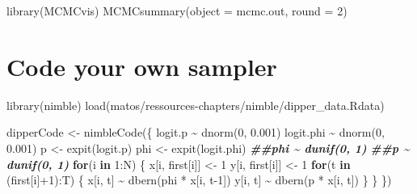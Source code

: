 \documentclass[
  12pt,
]{krantz}
\newenvironment{Shaded}{\begin{snugshade}}{\end{snugshade}}
\newcommand{\AttributeTok}[1]{\textcolor[rgb]{0.77,0.63,0.00}{#1}}
\newcommand{\ControlFlowTok}[1]{\textcolor[rgb]{0.13,0.29,0.53}{\textbf{#1}}}
\newcommand{\DecValTok}[1]{\textcolor[rgb]{0.00,0.00,0.81}{#1}}
\newcommand{\DocumentationTok}[1]{\textcolor[rgb]{0.56,0.35,0.01}{\textbf{\textit{#1}}}}
\newcommand{\FloatTok}[1]{\textcolor[rgb]{0.00,0.00,0.81}{#1}}
\newcommand{\FunctionTok}[1]{\textcolor[rgb]{0.00,0.00,0.00}{#1}}
\newcommand{\NormalTok}[1]{#1}
\newcommand{\OtherTok}[1]{\textcolor[rgb]{0.56,0.35,0.01}{#1}}
\newcommand{\SpecialCharTok}[1]{\textcolor[rgb]{0.00,0.00,0.00}{#1}}
\newcommand{\StringTok}[1]{\textcolor[rgb]{0.31,0.60,0.02}{#1}}
\begin{document}
\begin{Shaded}
\begin{Highlighting}[]
\FunctionTok{library}\NormalTok{(MCMCvis)}
\FunctionTok{MCMCsummary}\NormalTok{(}\AttributeTok{object =}\NormalTok{ mcmc.out, }\AttributeTok{round =} \DecValTok{2}\NormalTok{)}
\end{Highlighting}
\end{Shaded}

\hypertarget{code-your-own-sampler}{%
\section{Code your own sampler}\label{code-your-own-sampler}}

\begin{Shaded}
\begin{Highlighting}[]
\FunctionTok{library}\NormalTok{(nimble)}
\FunctionTok{load}\NormalTok{(}\StringTok{\textquotesingle{}matos/ressources{-}chapters/nimble/dipper\_data.Rdata\textquotesingle{}}\NormalTok{)}

\NormalTok{dipperCode }\OtherTok{\textless{}{-}} \FunctionTok{nimbleCode}\NormalTok{(\{}
\NormalTok{    logit.p }\SpecialCharTok{\textasciitilde{}} \FunctionTok{dnorm}\NormalTok{(}\DecValTok{0}\NormalTok{, }\FloatTok{0.001}\NormalTok{)}
\NormalTok{    logit.phi }\SpecialCharTok{\textasciitilde{}} \FunctionTok{dnorm}\NormalTok{(}\DecValTok{0}\NormalTok{, }\FloatTok{0.001}\NormalTok{)}
\NormalTok{    p }\OtherTok{\textless{}{-}} \FunctionTok{expit}\NormalTok{(logit.p)}
\NormalTok{    phi }\OtherTok{\textless{}{-}} \FunctionTok{expit}\NormalTok{(logit.phi)}
    \DocumentationTok{\#\#phi \textasciitilde{} dunif(0, 1)}
    \DocumentationTok{\#\#p \textasciitilde{} dunif(0, 1)}
    \ControlFlowTok{for}\NormalTok{(i }\ControlFlowTok{in} \DecValTok{1}\SpecialCharTok{:}\NormalTok{N) \{}
\NormalTok{        x[i, first[i]] }\OtherTok{\textless{}{-}} \DecValTok{1}
\NormalTok{        y[i, first[i]] }\OtherTok{\textless{}{-}} \DecValTok{1}
        \ControlFlowTok{for}\NormalTok{(t }\ControlFlowTok{in}\NormalTok{ (first[i]}\SpecialCharTok{+}\DecValTok{1}\NormalTok{)}\SpecialCharTok{:}\NormalTok{T) \{}
\NormalTok{            x[i, t] }\SpecialCharTok{\textasciitilde{}} \FunctionTok{dbern}\NormalTok{(phi }\SpecialCharTok{*}\NormalTok{ x[i, t}\DecValTok{{-}1}\NormalTok{])}
\NormalTok{            y[i, t] }\SpecialCharTok{\textasciitilde{}} \FunctionTok{dbern}\NormalTok{(p }\SpecialCharTok{*}\NormalTok{ x[i, t])}
\NormalTok{        \}}
\NormalTok{    \}}
\NormalTok{\})}


\end{Highlighting}
\end{Shaded}
\end{document}

